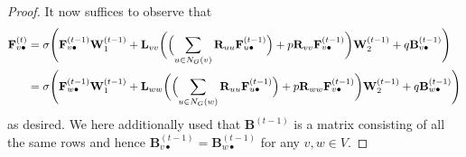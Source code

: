 \begin{proof}
  It now suffices to observe that
  \begin{align*}
	  \mathbf{F}^{(t)}_{v\bullet}&=\sigma\Biggl(\mathbf{F}^{(t-1)}_{v\bullet}\mathbf{W}_1^{(t-1)}+\mathbf{L}_{vv}\biggl(\Bigl(\sum_{u\in N_G(v)} \mathbf{R}_{uu}\mathbf{F}^{(t-1)}_{u\bullet}\Bigr)+p\mathbf{R}_{vv}\mathbf{F}^{(t-1)}_{v\bullet}\biggr)\mathbf{W}_2^{(t-1)}+ q\mathbf{B}^{(t-1)}_{v\bullet}\Biggr)\\
	 &=\sigma\Biggl(\mathbf{F}^{(t-1)}_{w\bullet}\mathbf{W}_1^{(t-1)}+\mathbf{L}_{ww}\biggl(\Bigl(\sum_{u\in N_G(w)} \mathbf{R}_{uu}\mathbf{F}^{(t-1)}_{u\bullet}\Bigr)+p\mathbf{R}_{ww}\mathbf{F}^{(t-1)}_{v\bullet}\biggr)\mathbf{W}_2^{(t-1)}+ q\mathbf{B}^{(t-1)}_{w\bullet}\Biggr) \end{align*}
as desired. We here additionally used that $\mathbf{B}^{(t-1)}$ is a matrix consisting of all the same rows and hence $\mathbf{B}^{(t-1)}_{v\bullet}=\mathbf{B}^{(t-1)}_{w\bullet}$ for any $v,w\in V$.
\end{proof}

